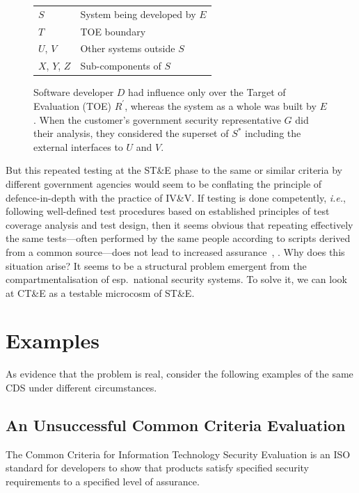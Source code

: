 \documentclass[10pt,letterpaper,conference,compsocconf]{IEEEtran}
\begin{document}
\begin{figure}[!t]
{{\begin{tabular}[b]{lp{5cm}}
				$S$ & System being developed by $E$ \\
				$T$ & TOE boundary \\
				$U$, $V$ & Other systems outside $S$ \\
				$X$, $Y$, $Z$ & Sub-components of $S$ \\
			\end{tabular}
			\label{figure:subfigure-b}
		}
	}
    \caption{Software developer $D$ had influence only
        over the Target of Evaluation (TOE) $R^\prime$, whereas the
        system as a whole was built by $E$.  When the customer's
        government security representative
        $G$ did their analysis, they considered the superset of
        $S^\ast$ including the external interfaces to $U$ and $V$.}
    \label{figure:context-diagram}
\end{figure}

But this repeated testing at the ST\&E phase to the same or
similar criteria by different
government agencies would seem to be conflating the principle of
defence-in-depth with the practice of IV\&V.  If testing is
done competently, {\it i.e.}, following well-defined test
procedures based on established principles of test
coverage analysis and test design,
then it seems obvious that repeating effectively
the same tests---often performed by the same people according to scripts
derived from a common source---does not lead to increased
assurance~\cite[Chapter 13]{Beizer1990}, \cite[Chapter 14]{Kletz1999}.
Why does this situation arise?  It seems to be a
structural problem emergent from the compartmentalisation of esp.\ national
security systems.  To solve it, we can look at CT\&E as a testable
microcosm of ST\&E.

\section{Examples}\label{examples}

As evidence that the problem is real, consider the following
examples of the same CDS under different circumstances.

\subsection{An Unsuccessful Common Criteria Evaluation}

The Common Criteria for Information Technology Security Evaluation
is an ISO standard for developers to show that
products satisfy specified security requirements to a specified
level of assurance.
\end{document}
